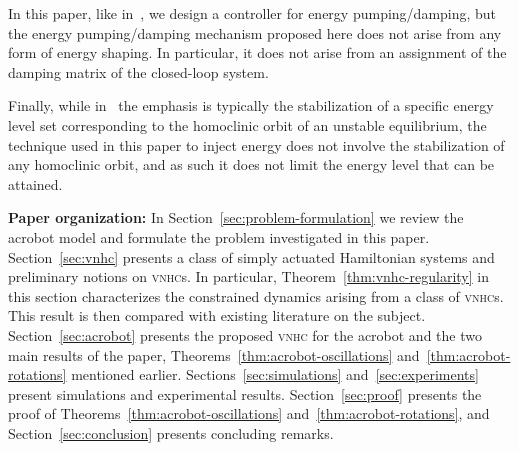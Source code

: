 \documentclass[journal,twoside,web, twocolumn]{ieeecolor}
\newcommand*{\vnhc}{\textsc{vnhc}\xspace}
\newcommand*{\vnhcs}{\textsc{vnhc}s\xspace}
\begin{document}
In this paper, like in~\cite{YiOrtWuZha20}, we design a controller for energy pumping/damping, but the energy pumping/damping mechanism proposed here does not arise from any form of energy shaping. In particular, it does not arise from an assignment of the damping matrix of the closed-loop system.

Finally, while in~\cite{FanLoz02} the emphasis is typically the stabilization of a specific energy level set corresponding to the homoclinic orbit of an unstable equilibrium, the technique used in this paper to inject energy does not involve the stabilization of any homoclinic orbit, and as such it does not limit the energy level that can be attained.


\textbf{Paper organization:}
In Section~\ref{sec:problem-formulation} we review the acrobot model and formulate the problem investigated in this paper. Section~\ref{sec:vnhc} presents a class of simply actuated Hamiltonian systems and preliminary notions on \vnhcs. In particular, Theorem~\ref{thm:vnhc-regularity} in this section characterizes the constrained dynamics arising from a class of \vnhcs. This result is then compared with existing literature on the subject. Section~\ref{sec:acrobot} presents the proposed \vnhc for the acrobot and the two main results of the paper, Theorems~\ref{thm:acrobot-oscillations} and~\ref{thm:acrobot-rotations} mentioned earlier. Sections~\ref{sec:simulations} and~\ref{sec:experiments} present simulations and experimental results. Section~\ref{sec:proof} presents the proof of Theorems~\ref{thm:acrobot-oscillations} and~\ref{thm:acrobot-rotations}, and Section~\ref{sec:conclusion} presents concluding remarks.
\end{document}
